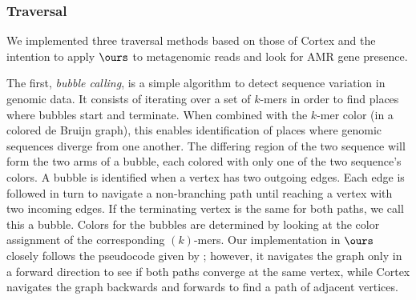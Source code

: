 %
%

\subsubsection{Traversal}
We implemented three traversal methods based on those of {\sc Cortex} and the intention to apply $\ours$ to metagenomic reads and look for AMR gene presence.

The first, {\it bubble calling}, is a simple algorithm to detect sequence variation in genomic data. It consists of iterating over a set of $k$-mers in order to find places where bubbles start and terminate.  When combined with the $k$-mer color (in a colored de Bruijn graph), this enables identification of places where genomic sequences diverge from one another.  The differing region of the two sequence will form the two arms of a bubble, each colored with only one of the two sequence's colors.  A bubble is identified when a vertex has two outgoing edges. Each edge is followed in turn to navigate a non-branching path until reaching a vertex with two incoming edges. If the terminating vertex is the same for both paths, we call this a bubble. Colors for the bubbles are determined by looking at the color assignment of the corresponding $(k)$-mers. Our implementation in $\ours$ closely follows the pseudocode given by \cite{ICTFM12}; however, it navigates the graph only in a forward direction to see if both paths converge at the same vertex, while {\sc Cortex} navigates the graph backwards and forwards to find a path of adjacent vertices.

